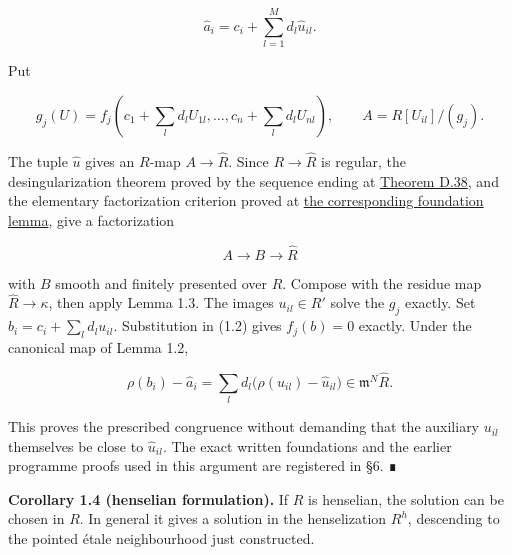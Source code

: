\documentclass[11pt,a4paper,openany]{report}
\begin{document}
\[
\widehat a_i=c_i+\sum_{l=1}^M d_l\widehat u_{il}.
\]

Put

\[
g_j(U)=f_j\left(c_1+\sum_l d_lU_{1l},\ldots,
c_n+\sum_l d_lU_{nl}\right),
\qquad A=R[U_{il}]/(g_j).
\tag{1.2}
\]

The tuple \(\widehat u\) gives an \(R\)-map \(A\to\widehat R\). Since \(R\to\widehat R\) is regular, the desingularization theorem proved by the sequence ending at \hyperref[AG-RG-S05-smoothing-theorem-popescu]{Theorem D.38}, and the elementary factorization criterion proved at \hyperref[AG-RG-S05-algebra-lemma-when-colimit]{the corresponding foundation lemma}, give a factorization

\[
A\longrightarrow B\longrightarrow\widehat R
\tag{1.3}
\]

with \(B\) smooth and finitely presented over \(R\). Compose with the residue map \(\widehat R\to\kappa\), then apply Lemma 1.3. The images \(u_{il}\in R'\) solve the \(g_j\) exactly. Set \(b_i=c_i+\sum_l d_lu_{il}\). Substitution in (1.2) gives \(f_j(b)=0\) exactly. Under the canonical map of Lemma 1.2,

\[
\rho(b_i)-\widehat a_i
=\sum_l d_l\bigl(\rho(u_{il})-\widehat u_{il}\bigr)
\in\mathfrak m^N\widehat R.
\]

This proves the prescribed congruence without demanding that the auxiliary \(u_{il}\) themselves be close to \(\widehat u_{il}\). The exact written foundations and the earlier programme proofs used in this argument are registered in §6. ∎

\textbf{Corollary 1.4 (henselian formulation).} If \(R\) is henselian, the solution can be chosen in \(R\). In general it gives a solution in the henselization \(R^h\), descending to the pointed étale neighbourhood just constructed.
\end{document}
